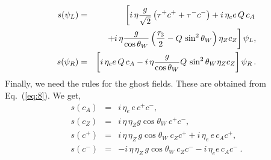 \documentclass{ws-ijmpa}
\begin{document}
%
\begin{eqnarray}
s(\psi_L) 
&=&
\left[   i\, \eta \frac{g}{\sqrt{2}} \left(
 \tau^+ c^+  +  \tau^- c^- \right) +i\, \eta_e e\, Q\,   c_A
\right.
\nonumber\\
&&
\left.
\hspace{4mm}
+ i\, \eta \frac{g}{\cos\theta_W} \left(\frac{\tau_3}{2} - Q\, \sin^2\theta_W
\right) \eta_Z c_Z \right] \psi_L,
\nonumber\\
s(\psi_R)
&=& \left[ i\, \eta_e  e\, Q\,   c_A
- i\, \eta \frac{ g}{\cos\theta_W}  Q\, \sin^2\theta_W 
\eta_Z c_Z \right] \psi_R\, .
\label{eq:16}
\end{eqnarray}
%
Finally,
we need the rules for the ghost fields.
These are obtained from Eq.~(\ref{eq:8}).
We get,
%
\begin{eqnarray}
s(c_A)
&=&
i\, \eta_e\, e\, c^+ c^- ,
\nonumber\\[+2mm]
s(c_Z)
&=&
i\, \eta\, \eta_Z g \cos\theta_W\ c^+ c^- ,
\nonumber\\[+2mm]
s(c^+)
&=&
i\, \eta\,\eta_Z\, g \cos\theta_W\ c_Z c^+ 
         + i\, \eta_e\, e\, c_A c^+ ,
\nonumber\\[+2mm]
s(c^-)
&=&
-i\,\eta\,\eta_Z\, g  \cos\theta_W\ c_Z c^- 
- i\, \eta_e e\, c_A c^-\ .
\label{eq:17}
\end{eqnarray}



%
\end{document}
